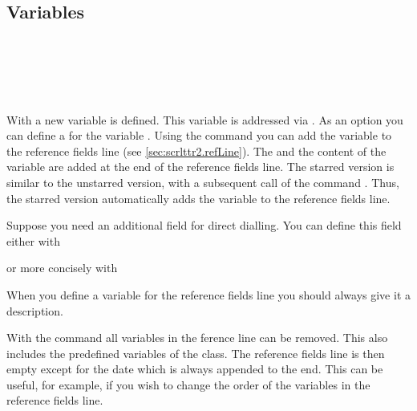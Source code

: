 \subsection{Variables}
\label{sec:scrlttr2-experts.variables}

%

\begin{Declaration}
  \\
  \\
  \\
  \\
\end{Declaration}
%
%
%
With  a new variable is defined. This variable is
addressed via . As an option you can define a
 for the variable . Using the command
 you can add the variable  to the
reference fields line (see \autoref{sec:scrlttr2.refLine}). The
 and the content of the variable are added at the
end of the reference fields line. The starred version
 is similar to the unstarred version, with a
subsequent call of the command . Thus, the
starred version automatically adds the variable to the reference
fields line.
\begin{Example}
  Suppose you need an additional field for direct dialling. You can
  define this field either with
\begin{lstcode}
\end{lstcode}
  or more concisely with
\begin{lstcode}
\end{lstcode}

\end{Example}
When you define a variable for the reference fields line you should always
give it a description.

With the command  all variables in the ference
line can be removed. This also includes the predefined variables of
the class. The reference fields line is then empty except for the date
which is always appended to the end. This can be useful, for example,
if you wish to change the order of the variables in the reference
fields line.

